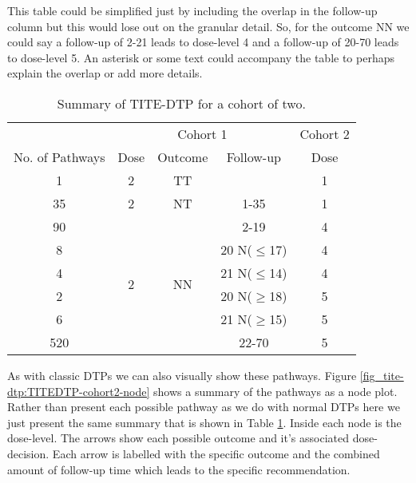 This table could be simplified just by including the overlap in the follow-up column but this would lose out on the granular detail. So, for the outcome NN we could say a follow-up of 2-21 leads to dose-level 4 and a follow-up of 20-70 leads to dose-level 5. An asterisk or some text could accompany the table to perhaps explain the overlap or add more details. 

\begin{table}[H]
	\centering
	\caption{Summary of TITE-DTP for a cohort of two.}
	\label{tab_tite-dtp:TITEDTP_c2_Sum}
	\begin{tabular}{ccccc}
		\hline
		\multicolumn{1}{l}{} &                 \multicolumn{3}{c}{Cohort 1}    & Cohort 2 \\ 
		\cmidrule(l{3pt}r{3pt}){2-4} \cmidrule(l{3pt}r{3pt}){5-5}
		No. of Pathways   & Dose  				& Outcome             & Follow-up 		& Dose     \\ \hline
		1                 & 2               	& TT                  &          		& 1        \\ \hline
		35                & 2            		& NT                  & 1-35      		& 1        \\ \hline
		90   			  & \multirow{6}{*}{2}  & \multirow{6}{*}{NN} & 2-19      		& 4        \\
		8				  &                		&                     & 20 N($\leq$17)  & 4        \\
		4				  &                		&                     & 21 N($\leq$14)  & 4        \\
		2				  &                		&                     & 20 N($\geq$18)  & 5        \\
		6				  &                		&                     & 21 N($\geq$15)  & 5        \\
		520				  &              		&                     & 22-70     		& 5        \\ \hline
	\end{tabular}
\end{table}

As with classic DTPs we can also visually show these pathways. Figure \ref{fig_tite-dtp:TITEDTP-cohort2-node} shows a summary of the pathways as a node plot. Rather than present each possible pathway as we do with normal DTPs here we just present the same summary that is shown in Table \ref{tab_tite-dtp:TITEDTP_c2_Sum}. Inside each node is the dose-level. The arrows show each possible outcome and it's associated dose-decision. Each arrow is labelled with the specific outcome and the combined amount of follow-up time  which leads to the specific recommendation. 

